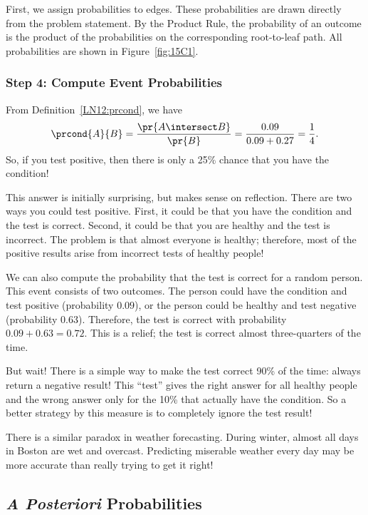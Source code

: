 First, we assign probabilities to edges.  These probabilities are
drawn directly from the problem statement.  By the Product Rule, the
probability of an outcome is the product of the probabilities on the
corresponding root-to-leaf path.  All probabilities are shown in
Figure~\ref{fig:15C1}.

\subsubsection*{Step 4: Compute Event Probabilities}

From Definition~\ref{LN12:prcond}, we have
\begin{equation*}
\prcond{A}{B}	= \frac{\pr{A \intersect B}}{\pr{B}} %
		= \frac{0.09}{0.09 + 0.27} %
		= \frac{1}{4}.
\end{equation*}
%
So, if you test positive, then there is only a 25\% chance that you
have the condition!

This answer is initially surprising, but makes sense on reflection.
There are two ways you could test positive.  First, it could be that
you have the condition and the test is correct.  Second, it could be that you
are healthy and the test is incorrect.  The problem is that almost
everyone is healthy; therefore, most of the positive results arise
from incorrect tests of healthy people!

We can also compute the probability that the test is correct for a
random person.  This event consists of two outcomes.  The person could
have the condition and test positive (probability $0.09$), or the person
could be healthy and test negative (probability $0.63$).
Therefore, the test is correct with probability $0.09 + 0.63 = 0.72$.
This is a relief; the test is correct almost three-quarters of the
time.

But wait!  There is a simple way to make the test correct 90\% of the
time: always return a negative result!  This ``test'' gives the right
answer for all healthy people and the wrong answer only for the 10\%
that actually have the condition.  So a better strategy by this
measure is to completely ignore the test result!

There is a similar paradox in weather forecasting.  During winter,
almost all days in Boston are wet and overcast.  Predicting miserable
weather every day may be more accurate than really trying to get it
right!


\subsection{\emph{A Posteriori} Probabilities}\label{aposteriori_subsec}

